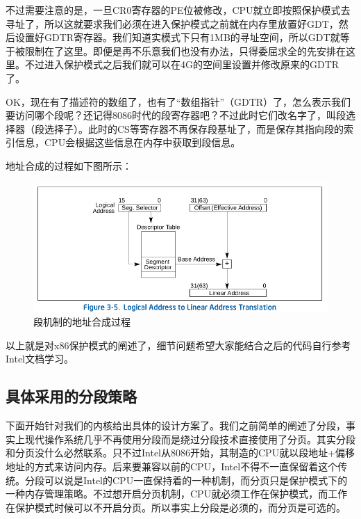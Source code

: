 \par 不过需要注意的是，一旦CR0寄存器的PE位被修改，CPU就立即按照保护模式去寻址了，所以这就要求我们必须在进入保护模式之前就在内存里放置好GDT，然后设置好GDTR寄存器。我们知道实模式下只有1MB的寻址空间，所以GDT就等于被限制在了这里。即便是再不乐意我们也没有办法，只得委屈求全的先安排在这里。不过进入保护模式之后我们就可以在4G的空间里设置并修改原来的GDTR了。

\par OK，现在有了描述符的数组了，也有了“数组指针”（GDTR）了，怎么表示我们要访问哪个段呢？还记得8086时代的段寄存器吧？不过此时它们改名字了，叫段选择器（段选择子）。此时的CS等寄存器不再保存段基址了，而是保存其指向段的索引信息，CPU会根据这些信息在内存中获取到段信息。

\par 地址合成的过程如下图所示：

\begin{figure}[ht]
      \centering
      \includegraphics[scale=0.5]{picture/chapt6/protected_segment_addr.png}
      \caption{段机制的地址合成过程}
\end{figure}

\par 以上就是对x86保护模式的阐述了，细节问题希望大家能结合之后的代码自行参考Intel文档学习。

\subsection{具体采用的分段策略}

\par 下面开始针对我们的内核给出具体的设计方案了。我们之前简单的阐述了分段，事实上现代操作系统几乎不再使用分段而是绕过分段技术直接使用了分页。其实分段和分页没什么必然联系。只不过Intel从8086开始，其制造的CPU就以段地址+偏移地址的方式来访问内存。后来要兼容以前的CPU，Intel不得不一直保留着这个传统。分段可以说是Intel的CPU一直保持着的一种机制，而分页只是保护模式下的一种内存管理策略。不过想开启分页机制，CPU就必须工作在保护模式，而工作在保护模式时候可以不开启分页。所以事实上分段是必须的，而分页是可选的。

